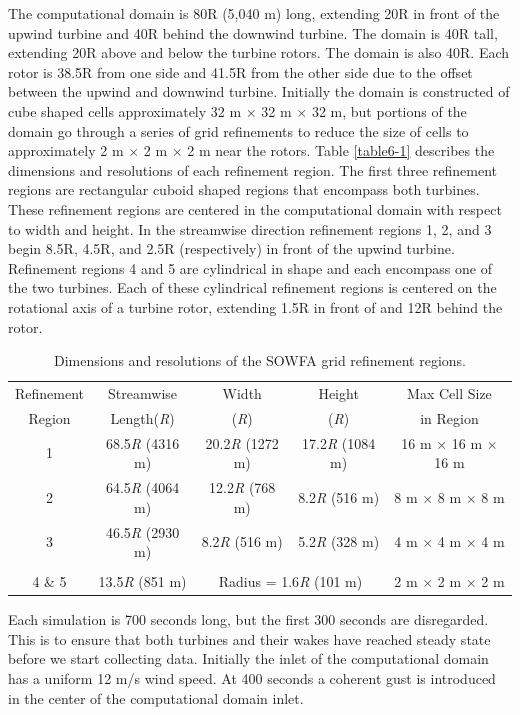 The computational domain is 80R (5,040 m) long, extending 20R in front of the upwind turbine and 40R behind the downwind turbine. The domain is 40R tall, extending 20R above and below the turbine rotors. The domain is also 40R. Each rotor is 38.5R from one side and 41.5R from the other side due to the offset between the upwind and downwind turbine. Initially the domain is constructed of cube shaped cells approximately 32 m $\times$ 32 m $\times$ 32 m, but portions of the domain go through a series of grid refinements to reduce the size of cells to approximately 2 m $\times$ 2 m $\times$ 2 m near the rotors. Table \ref{table6-1} describes the dimensions and resolutions of each refinement region. The first three refinement regions are rectangular cuboid shaped regions that encompass both turbines. These refinement regions are centered in the computational domain with respect to width and height. In the streamwise direction refinement regions 1, 2, and 3 begin 8.5R, 4.5R, and 2.5R (respectively) in front of the upwind turbine. Refinement regions 4 and 5 are cylindrical in shape and each encompass one of the two turbines. Each of these cylindrical refinement regions is centered on the rotational axis of a turbine rotor, extending 1.5R in front of and 12R behind the rotor.


\begin{table} \label{Table6-1}
\centering
\caption{ Dimensions and resolutions of the SOWFA grid refinement regions.}
\begin{tabular}{c c c c c}
\hline
Refinement & Streamwise  & Width & Height & Max Cell Size\\
Region & Length(\emph{R}) & (\emph{R})  &  (\emph{R}) & in Region\\
\hline
1 & 68.5\emph{R} (4316 m)  & 20.2\emph{R} (1272 m) & 17.2\emph{R} (1084 m) & 16 m $\times$ 16 m $\times$ 16 m\\
2 & 64.5\emph{R} (4064 m)  & 12.2\emph{R} (768 m) & 8.2\emph{R} (516 m)  & 8 m $\times$ 8 m $\times$ 8 m\\
3 & 46.5\emph{R} (2930 m)  & 8.2\emph{R} (516 m) & 5.2\emph{R} (328 m)  & 4 m $\times$ 4 m $\times$ 4 m\\
\\
4 \& 5 & 13.5\emph{R} (851 m)    & \multicolumn{2}{c}{Radius = 1.6\emph{R} (101 m)}   & 2 m $\times$ 2 m $\times$ 2 m\\
\hline
\end{tabular}
\end{table}

Each simulation is 700 seconds long, but the first 300 seconds are disregarded. This is to ensure that both turbines and their wakes have reached steady state before we start collecting data. Initially the inlet of the computational domain has a uniform 12 m/s wind speed. At 400 seconds a coherent gust is introduced in the center of the computational domain inlet. 

